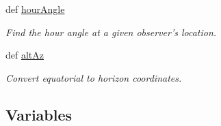 \begin{DoxyCompactItemize}
def \hyperlink{namespaceamonpy_1_1sim_1_1sidereal_a5bd5459044e31d6dc85bb5e34841057b}{hour\-Angle}
\begin{DoxyCompactList}\small\item\em Find the hour angle at a given observer's location. \end{DoxyCompactList}\item 
def \hyperlink{namespaceamonpy_1_1sim_1_1sidereal_a6fb37fea3ede082ddd9c84313433734a}{alt\-Az}
\begin{DoxyCompactList}\small\item\em Convert equatorial to horizon coordinates. \end{DoxyCompactList}\end{DoxyCompactItemize}
\subsection*{Variables}
